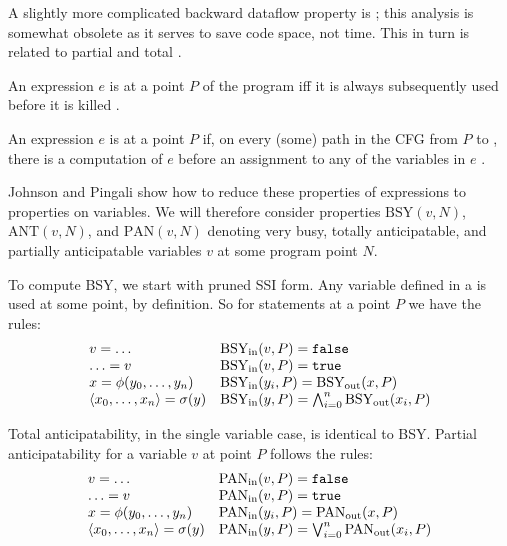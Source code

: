\documentclass[12pt,titlepage,twoside]{article}
\begin{document}
A slightly more complicated backward dataflow property is
; this analysis is somewhat obsolete as
it serves to save code space, not time.  This in turn is related to
partial and total .

\begin{definition}
An expression $e$ is  at a point $P$ of the program iff it
is always subsequently used before it is killed \cite{offner95}.
\end{definition}
\begin{definition}
An expression $e$ is  at a
point $P$ if, on every (some) path in the CFG from $P$ to ,
there is a computation of $e$ before an assignment to any of the
variables in $e$ \cite{johnson93:dfg}.
\end{definition}

Johnson and Pingali \cite{johnson93:dfg} show how to reduce these
properties of expressions to properties on variables.  We will
therefore consider properties $\text{BSY}(v,N)$, $\text{ANT}(v,N)$,
and $\text{PAN}(v,N)$ denoting very busy, totally anticipatable, and
partially anticipatable variables $v$ at some program point $N$.

To compute BSY, we start with pruned SSI form.  Any variable defined
in a \phisigfunction[or]{} is used at some point, by definition.
So for statements at a point $P$ we have the rules:
\begin{displaymath}
\begin{array}{ll}
v = \ldots & \text{BSY}_{\text{in}}(v,P)=\texttt{false} \\
\ldots = v & \text{BSY}_{\text{in}}(v,P)=\texttt{true} \\
x=\phi(y_0,\ldots,y_n) &
       \text{BSY}_{\text{in}}(y_i,P)=\text{BSY}_{\text{out}}(x,P) \\
\left\langle x_0,\ldots,x_n \right\rangle=\sigma(y) &
       \text{BSY}_{\text{in}}(y,P)=\bigwedge_{i=0}^n \text{BSY}_{\text{out}}(x_i,P) \\
\end{array}
\end{displaymath}

Total anticipatability, in the single variable case, is identical to
BSY.  Partial anticipatability for a variable $v$ at point $P$ follows
the rules:
\begin{displaymath}
\begin{array}{ll}
v = \ldots & \text{PAN}_{\text{in}}(v,P)=\texttt{false} \\
\ldots = v & \text{PAN}_{\text{in}}(v,P)=\texttt{true} \\
x=\phi(y_0,\ldots,y_n) &
       \text{PAN}_{\text{in}}(y_i,P)=\text{PAN}_{\text{out}}(x,P) \\
\left\langle x_0,\ldots,x_n \right\rangle=\sigma(y) &
       \text{PAN}_{\text{in}}(y,P)=\bigvee_{i=0}^n \text{PAN}_{\text{out}}(x_i,P) \\
\end{array}
\end{displaymath}
\end{document}
